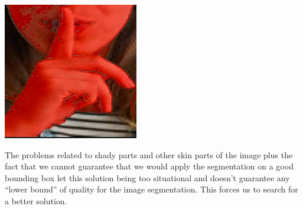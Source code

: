 \begin{center}
    \includegraphics[scale=1.2]{images/unused_seg/output105.PNG}
\end{center}
\noindent
The problems related to shady parts and other skin parts of the image plus the fact that we cannot guarantee that we would apply the segmentation on a good bounding box let this solution being too situational and doesn’t guarantee any “lower bound” of quality for the image segmentation. This forces us to search for a better solution.